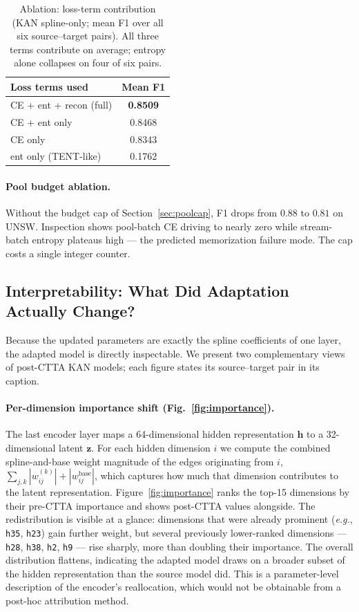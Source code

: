 \documentclass[10pt, conference, letterpaper]{IEEEtran}
\begin{document}
\begin{table}[h]
\centering
\caption{Ablation: loss-term contribution (KAN spline-only; mean F1 over all six source--target pairs). All three terms contribute on average; entropy alone collapses on four of six pairs.}
\label{tab:ablate_loss}
\begin{tabular}{lc}
\toprule
\textbf{Loss terms used} & \textbf{Mean F1} \\
\midrule
CE + ent + recon (full)  & \textbf{0.8509} \\
CE + ent only            & 0.8468 \\
CE only                  & 0.8343 \\
ent only (TENT-like)     & 0.1762 \\
\bottomrule
\end{tabular}
\end{table}

\paragraph{Pool budget ablation.} Without the budget cap of Section~\ref{sec:poolcap}, F1 drops from $0.88$ to $0.81$ on UNSW. Inspection shows pool-batch CE driving to nearly zero while stream-batch entropy plateaus high --- the predicted memorization failure mode. The cap costs a single integer counter.


\subsection{Interpretability: What Did Adaptation Actually Change?}
\label{sec:rq4}

Because the updated parameters are exactly the spline coefficients of one layer, the adapted model is directly inspectable. We present two complementary views of post-CTTA KAN models; each figure states its source--target pair in its caption.

\paragraph{Per-dimension importance shift (Fig.~\ref{fig:importance}).}
The last encoder layer maps a 64-dimensional hidden representation $\mathbf{h}$ to a 32-dimensional latent $\mathbf{z}$. For each hidden dimension $i$ we compute the combined spline-and-base weight magnitude of the edges originating from $i$, $\sum_{j,k} |w_{ij}^{(k)}| + |w^{\text{base}}_{ij}|$, which captures how much that dimension contributes to the latent representation. Figure~\ref{fig:importance} ranks the top-15 dimensions by their pre-CTTA importance and shows post-CTTA values alongside. The redistribution is visible at a glance: dimensions that were already prominent (\textit{e.g.}, \texttt{h35}, \texttt{h23}) gain further weight, but several previously lower-ranked dimensions --- \texttt{h28}, \texttt{h38}, \texttt{h2}, \texttt{h9} --- rise sharply, more than doubling their importance. The overall distribution flattens, indicating the adapted model draws on a broader subset of the hidden representation than the source model did. This is a parameter-level description of the encoder's reallocation, which would not be obtainable from a post-hoc attribution method.
\end{document}
